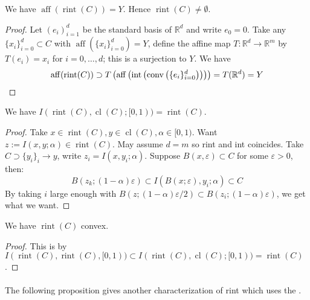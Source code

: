 \begin{prop}
	\label{prop:012-relint-nonempty}
	We have $\operatorname{aff}(\operatorname{rint}(C))=Y$. Hence $\operatorname{rint}(C)\neq\emptyset$.
\end{prop}

\begin{proof}
	Let $(e_i)_{i=1}^d$ be the standard basis of $\mathbb{R}^d$ and write $e_0=0$. Take any $\{x_i\}_{i=0}^d\subset C$ with $\operatorname{aff}(\{x_i\}_{i=0}^d)=Y$, define the affine map $T:\mathbb{R}^d\to \mathbb{R}^m$ by $T(e_i)=x_i$ for $i=0,\dotsc,d$; this is a surjection to $Y$. We have
	\[
		\operatorname{aff}(\operatorname{rint}(C)) \supset T\left(\operatorname{aff}\left(\operatorname{int}\left(\operatorname{conv}\left(\{e_i\}_{i=0}^d\right)\right)\right)\right)=T(\mathbb{R}^d)=Y\qedhere{}
	\]
\end{proof}

\begin{prop}
	\label{prop:012-linesegmentprinciple}
	We have $I(\operatorname{rint}(C),\operatorname{cl}(C);[0,1))=\operatorname{rint}(C)$.
\end{prop}

\begin{proof}
	Take $x\in \operatorname{rint}(C),y\in \operatorname{cl}(C), \alpha \in[0, 1)$. Want $z:=I(x, y; \alpha )\in\operatorname{rint}(C)$. May assume $d=m$ so rint and int coincides. Take $C\supset\{y_i\}_i\to y$, write $z_i=I(x,y_i;\alpha )$. Suppose $B(x,\varepsilon )\subset C$ for some $\varepsilon >0$, then:
	\[
		B(z_k;(1-\alpha )\varepsilon )\subset I(B(x;\varepsilon ),y_i;\alpha)\subset C
	\]
	By taking $i$ large enough with $B(z;(1-\alpha )\varepsilon /2)\subset B(z_i;(1-\alpha )\varepsilon )$, we get what we want.
\end{proof}

\begin{coro}
	\label{coro:012-relint-conv}
	We have $\operatorname{rint}(C)$ convex.
\end{coro}

\begin{proof}This is by $I(\operatorname{rint}(C),\operatorname{rint}(C),[0, 1))\subset
		I(\operatorname{rint}(C),\operatorname{cl}(C);[0,1))=\operatorname{rint}(C)$.
\end{proof}


\paragraph{}The following proposition gives another characterization of rint which uses the .

